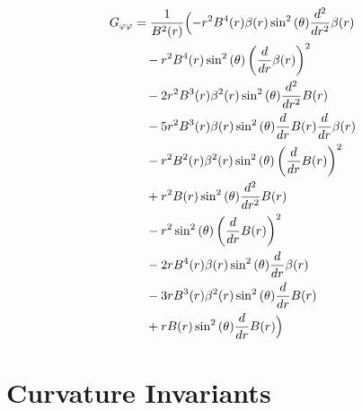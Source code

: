\documentclass[11pt,a4paper]{article}
\begin{document}
\begin{align*}
  G_{\varphi\varphi} &= \frac{1}{B^{2}{\left(r \right)}}\Bigl(- r^{2} B^{4}{\left(r \right)} \beta{\left(r \right)} \sin^{2}{\left(\theta \right)} \frac{d^{2}}{d r^{2}} \beta{\left(r \right)} \\
  &\quad - r^{2} B^{4}{\left(r \right)} \sin^{2}{\left(\theta \right)} \left(\frac{d}{d r} \beta{\left(r \right)}\right)^{2} \\
  &\quad - 2 r^{2} B^{3}{\left(r \right)} \beta^{2}{\left(r \right)} \sin^{2}{\left(\theta \right)} \frac{d^{2}}{d r^{2}} B{\left(r \right)} \\
  &\quad - 5 r^{2} B^{3}{\left(r \right)} \beta{\left(r \right)} \sin^{2}{\left(\theta \right)} \frac{d}{d r} B{\left(r \right)} \frac{d}{d r} \beta{\left(r \right)} \\
  &\quad - r^{2} B^{2}{\left(r \right)} \beta^{2}{\left(r \right)} \sin^{2}{\left(\theta \right)} \left(\frac{d}{d r} B{\left(r \right)}\right)^{2} \\
  &\quad + r^{2} B{\left(r \right)} \sin^{2}{\left(\theta \right)} \frac{d^{2}}{d r^{2}} B{\left(r \right)} \\
  &\quad - r^{2} \sin^{2}{\left(\theta \right)} \left(\frac{d}{d r} B{\left(r \right)}\right)^{2} \\
  &\quad - 2 r B^{4}{\left(r \right)} \beta{\left(r \right)} \sin^{2}{\left(\theta \right)} \frac{d}{d r} \beta{\left(r \right)} \\
  &\quad - 3 r B^{3}{\left(r \right)} \beta^{2}{\left(r \right)} \sin^{2}{\left(\theta \right)} \frac{d}{d r} B{\left(r \right)} \\
  &\quad + r B{\left(r \right)} \sin^{2}{\left(\theta \right)} \frac{d}{d r} B{\left(r \right)}\Bigr)
\end{align*}
\section{Curvature Invariants}
\end{document}
